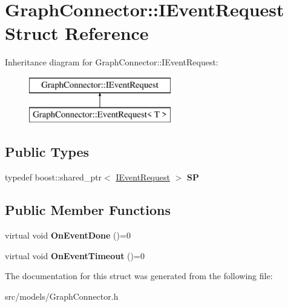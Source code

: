 \hypertarget{struct_graph_connector_1_1_i_event_request}{}\section{Graph\+Connector\+:\+:I\+Event\+Request Struct Reference}
\label{struct_graph_connector_1_1_i_event_request}
Inheritance diagram for Graph\+Connector\+:\+:I\+Event\+Request\+:\begin{figure}[H]
\begin{center}
\leavevmode
\includegraphics[height=2.000000cm]{struct_graph_connector_1_1_i_event_request}
\end{center}
\end{figure}
\subsection*{Public Types}
\begin{DoxyCompactItemize}
\item 
\mbox{\label{struct_graph_connector_1_1_i_event_request_ad97520a51fe7e23fbcd23d6fb7d19b05}} 
typedef boost\+::shared\+\_\+ptr$<$ \hyperlink{struct_graph_connector_1_1_i_event_request}{I\+Event\+Request} $>$ {\bfseries SP}
\end{DoxyCompactItemize}
\subsection*{Public Member Functions}
\begin{DoxyCompactItemize}
\item 
\mbox{\label{struct_graph_connector_1_1_i_event_request_a57552824dfce0edfbc594ec3177286f8}} 
virtual void {\bfseries On\+Event\+Done} ()=0
\item 
\mbox{\label{struct_graph_connector_1_1_i_event_request_af0c256a0a7f48fd0507e866f56fdbe31}} 
virtual void {\bfseries On\+Event\+Timeout} ()=0
\end{DoxyCompactItemize}


The documentation for this struct was generated from the following file\+:\begin{DoxyCompactItemize}
\item 
src/models/Graph\+Connector.\+h\end{DoxyCompactItemize}
